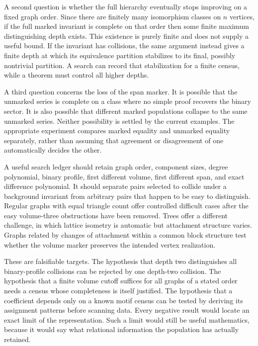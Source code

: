 \documentclass[
  11pt,
  a4paper,
]{report}
\begin{document}
A second question is whether the full hierarchy eventually stops
improving on a fixed graph order. Since there are finitely many
isomorphism classes on \(n\) vertices, if the full marked invariant is
complete on that order then some finite maximum distinguishing depth
exists. This existence is purely finite and does not supply a useful
bound. If the invariant has collisions, the same argument instead gives
a finite depth at which its equivalence partition stabilizes to its
final, possibly nontrivial partition. A search can record that
stabilization for a finite census, while a theorem must control all
higher depths.

A third question concerns the loss of the span marker. It is possible
that the unmarked series is complete on a class where no simple proof
recovers the binary sector. It is also possible that different marked
populations collapse to the same unmarked series. Neither possibility is
settled by the current examples. The appropriate experiment compares
marked equality and unmarked equality separately, rather than assuming
that agreement or disagreement of one automatically decides the other.

A useful search ledger should retain graph order, component sizes,
degree polynomial, binary profile, first different volume, first
different span, and exact difference polynomial. It should separate
pairs selected to collide under a background invariant from arbitrary
pairs that happen to be easy to distinguish. Regular graphs with equal
triangle count offer controlled difficult cases after the easy
volume-three obstructions have been removed. Trees offer a different
challenge, in which lattice isometry is automatic but attachment
structure varies. Graphs related by changes of attachment within a
common block structure test whether the volume marker preserves the
intended vertex realization.

These are falsifiable targets. The hypothesis that depth two
distinguishes all binary-profile collisions can be rejected by one
depth-two collision. The hypothesis that a finite volume cutoff suffices
for all graphs of a stated order needs a census whose completeness is
itself justified. The hypothesis that a coefficient depends only on a
known motif census can be tested by deriving its assignment patterns
before scanning data. Every negative result would locate an exact limit
of the representation. Such a limit would still be useful mathematics,
because it would say what relational information the population has
actually retained.
\end{document}
